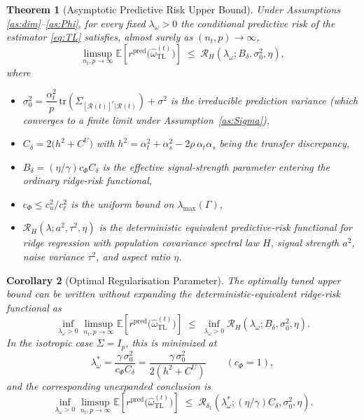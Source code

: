 \documentclass[11pt]{article}
\newtheorem{theorem}{Theorem}
\newtheorem{corollary}[theorem]{Corollary}
\theoremstyle{definition}
\newcommand{\Rt}{\mathcal{R}(t)}
\newcommand{\Rtc}{[\mathcal{R}(t)]^c}
\newcommand{\Sig}{\Sigma}
\newcommand{\SigSchur}{\Sigma_{\Rtc|\Rt}}
\newcommand{\ohat}{\hat{\omega}}
\newcommand{\E}{\mathbb{E}}
\newcommand{\tr}{\mathrm{tr}}
\newcommand{\lmax}{\lambda_{\max}}
\begin{document}
\begin{theorem}[Asymptotic Predictive Risk Upper Bound]\label{thm:main}
Under Assumptions
\ref{as:dim}--\ref{as:Phi}, for every fixed
$\lambda_\omega>0$ the conditional predictive risk of the estimator
\eqref{eq:TL} satisfies, almost surely as $(n_t,p)\to\infty$,
\begin{equation}\label{eq:risk_bound}
  \boxed{
  \limsup_{n_t,p\to\infty}
  \E\!\left[
  r^{\mathrm{pred}}\!\bigl(\ohat_{\mathrm{TL}}^{(t)}\bigr)
  \right]
  \;\le\;
  \mathcal R_H\!\left(\lambda_\omega;B_\delta,\sigma_0^2,\eta\right),
  }
\end{equation}
where
\begin{itemize}[nosep]
\item $\sigma_0^2
  =\dfrac{\alpha_t^2}{p}\,\tr(\SigSchur)+\sigma^2$
  is the irreducible prediction variance
  (which converges to a finite limit under
  Assumption~\ref{as:Sigma}),
\item $C_\delta=2\bigl(h^2+C^U\bigr)$ with
  $h^2=\alpha_t^2+\alpha_s^2-2\rho\,\alpha_t\alpha_s$
  being the transfer discrepancy,
\item $B_\delta=(\eta/\gamma)c_\Phi C_\delta$ is the effective
  signal-strength parameter entering the ordinary ridge-risk
  functional,
\item $c_\Phi\le c_u^2/c_\ell^2$ is the uniform bound on
  $\lmax(\Gamma)$,
\item $\mathcal R_H(\lambda;a^2,\tau^2,\eta)$ is the deterministic
  equivalent predictive-risk functional for ridge regression with
  population covariance spectral law $H$, signal strength $a^2$, noise
  variance $\tau^2$, and aspect ratio $\eta$.
\end{itemize}
\end{theorem}
 
\begin{corollary}[Optimal Regularisation Parameter]\label{cor:opt}
The optimally tuned upper bound can be written without expanding the
deterministic-equivalent ridge-risk functional as
\begin{equation}\label{eq:opt_lambda}
  \inf_{\lambda_\omega>0}
  \limsup_{n_t,p\to\infty}
  \E\!\left[
  r^{\mathrm{pred}}\!\bigl(\ohat_{\mathrm{TL}}^{(t)}\bigr)
  \right]
  \;\le\;
  \inf_{\lambda_\omega>0}
  \mathcal R_H\!\left(\lambda_\omega;B_\delta,\sigma_0^2,\eta\right).
\end{equation}
In the isotropic case $\Sig=I_p$, this is minimized at
\begin{equation}\label{eq:opt_iso}
  \lambda_\omega^*
  =\frac{\gamma\,\sigma_0^2}{c_\Phi C_\delta}
  =\frac{\gamma\,\sigma_0^2}{2(h^2+C^U)}
  \qquad(c_\Phi=1),
\end{equation}
and the corresponding unexpanded conclusion is
\begin{equation}\label{eq:opt_iso_unexpanded}
  \boxed{
  \inf_{\lambda_\omega>0}
  \limsup_{n_t,p\to\infty}
  \E\!\left[
  r^{\mathrm{pred}}\!\bigl(\ohat_{\mathrm{TL}}^{(t)}\bigr)
  \right]
  \;\le\;
  \mathcal R_{\delta_1}\!\left(
  \lambda_\omega^*;(\eta/\gamma)C_\delta,\sigma_0^2,\eta
  \right).
  }
\end{equation}
\end{corollary}
 
\end{document}
